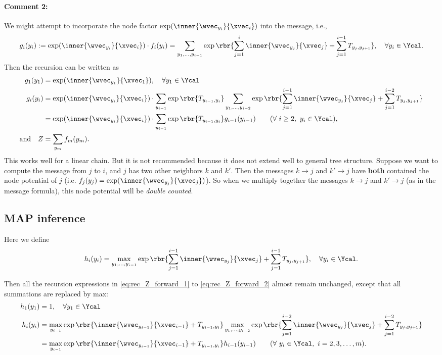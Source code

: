 \documentclass[11pt]{report}
\begin{document}
\paragraph{Comment 2:}
We might attempt to incorporate the node factor $\exp(\inner{\wvec_{y_i}}{\xvec_i})$ into the message, i.e.,
\begin{align}
	g_i(y_i) := \exp(\inner{\wvec_{y_i}}{\xvec_i}) \cdot f_i(y_i) = \sum_{y_1, \ldots, y_{i-1}} \exp \rbr{\sum_{j=1}^{i} \inner{\wvec_{y_j}}{\xvec_j} + \sum_{j=1}^{i-1} T_{y_j, y_{j+1}}}, \quad \forall y_i \in \Ycal.
\end{align}
Then the recursion can be written as
\begin{align}
	g_1(y_1) &= \exp(\inner{\wvec_{y_1}}{\xvec_1}), \quad \forall y_1 \in \Ycal \\
	g_i(y_i) &= \exp(\inner{\wvec_{y_i}}{\xvec_i}) \cdot \sum_{y_{i-1}} \exp \rbr{T_{y_{i-1}, y_i}}
	\sum_{y_1, \ldots, y_{i-2}} \exp \rbr{\sum_{j=1}^{i-1} \inner{\wvec_{y_j}}{\xvec_j} + \sum_{j=1}^{i-2} T_{y_j, y_{j+1}}} \\
	&= \exp(\inner{\wvec_{y_i}}{\xvec_i}) \cdot \sum_{y_{i-1}} \exp \rbr{T_{y_{i-1}, y_i}}  g_{i-1}(y_{i-1})  \qquad (\forall\ i \ge 2, \ y_i \in \Ycal), \\
	\text{and} \quad Z &= \sum_{y_m} f_m(y_m).
\end{align}
This works well for a linear chain.
But it is not recommended because it does not extend well to general tree structure.
Suppose we want to compute the message from $j$ to $i$, and $j$ has two other neighbors $k$ and $k'$.
Then the messages $k \to j$ and $k' \to j$ have \textbf{both} contained the node potential of $j$ (i.e. $f_j(y_j) = \exp (\inner{\wvec_{y_j}}{\xvec_j})$).
So when we multiply together the messages $k \to j$ and $k' \to j$ (as in the message formula),
this node potential will be \emph{double counted}.

\subsection{MAP inference}
\label{sec:MAP_formula}
Here we define
\begin{align}
	h_i(y_i) = \max_{y_1, \ldots, y_{i-1}} \exp \rbr{\sum_{j=1}^{i-1} \inner{\wvec_{y_j}}{\xvec_j} + \sum_{j=1}^{i-1} T_{y_j, y_{j+1}}}, \quad \forall y_i \in \Ycal.
\end{align}

Then all the recursion expressions in \eqref{eq:rec_Z_forward_1}	to \eqref{eq:rec_Z_forward_2} almost remain unchanged,
except that all summations are replaced by max:
\begin{align}
	\label{eq:rec_MAP_forward_1}
	h_1(y_1) &= 1, \quad \forall y_1 \in \Ycal \\
	h_i(y_i) &= \max_{y_{i-1}} \exp \rbr{\inner{\wvec_{y_{i-1}}}{\xvec_{i-1}} + T_{y_{i-1}, y_i}}
	\max_{y_1, \ldots, y_{i-2}} \exp \rbr{\sum_{j=1}^{i-2} \inner{\wvec_{y_j}}{\xvec_j} + \sum_{j=1}^{i-2} T_{y_j, y_{j+1}}} \\
	\label{eq:rec_MAP_forward_2}	
	&= \max_{y_{i-1}} \exp \rbr{\inner{\wvec_{y_{i-1}}}{\xvec_{i-1}} + T_{y_{i-1}, y_i}}  h_{i-1}(y_{i-1})  \qquad (\forall\ y_i \in \Ycal, \ i = 2, 3, \ldots, m).
\end{align}
\end{document}
